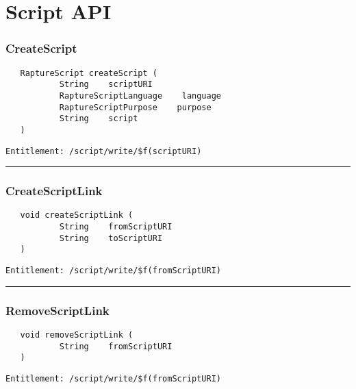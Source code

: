 \chapter{Script API}

\subsection{CreateScript}
\label{Api:CreateScript}
\begin{Verbatim}
   RaptureScript createScript (
           String    scriptURI
           RaptureScriptLanguage    language
           RaptureScriptPurpose    purpose
           String    script
   )
\end{Verbatim}
\begin{Verbatim}[formatcom=\color{Maroon}]
  Entitlement: /script/write/$f(scriptURI)
\end{Verbatim}



\rule{12cm}{2pt}
\subsection{CreateScriptLink}
\label{Api:CreateScriptLink}
\begin{Verbatim}
   void createScriptLink (
           String    fromScriptURI
           String    toScriptURI
   )
\end{Verbatim}
\begin{Verbatim}[formatcom=\color{Maroon}]
  Entitlement: /script/write/$f(fromScriptURI)
\end{Verbatim}



\rule{12cm}{2pt}
\subsection{RemoveScriptLink}
\label{Api:RemoveScriptLink}
\begin{Verbatim}
   void removeScriptLink (
           String    fromScriptURI
   )
\end{Verbatim}
\begin{Verbatim}[formatcom=\color{Maroon}]
  Entitlement: /script/write/$f(fromScriptURI)
\end{Verbatim}



